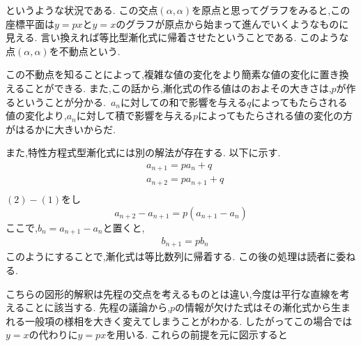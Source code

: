
  というような状況である.
  この交点$(\alpha,\alpha)$を原点と思ってグラフをみると,この座標平面は$y=px$と$y=x$のグラフが原点から始まって進んでいくようなものに見える.
  言い換えれば等比型漸化式に帰着させたということである.
  このような点$(\alpha,\alpha)$を不動点という.

  この不動点を知ることによって,複雑な値の変化をより簡素な値の変化に置き換えることができる.
  また,この話から,漸化式の作る値はのおよその大きさは,$p$が作るということが分かる.
  \,$a_n$に対しての和で影響を与える$q$によってもたらされる値の変化より,$a_n$に対して積で影響を与える$p$によってもたらされる値の変化の方がはるかに大きいからだ.

  また,特性方程式型漸化式には別の解法が存在する.
  以下に示す.
  \begin{align*}
    &a_{n+1}=pa_n+q \tag*{\(\cdots\) (1)}\\
    &a_{n+2}=pa_{n+1}+q \tag*{\(\cdots\) (2)}\\
  \end{align*}
  $(2)-(1)$をし
  \[
    a_{n+2}-a_{n+1}=p(a_{n+1}-a_n)
  \]
  ここで,$b_n=a_{n+1}-a_n$と置くと,
  \begin{align*}
    &b_{n+1}=pb_n
  \end{align*}
  このようにすることで,漸化式は等比数列に帰着する.
  この後の処理は読者に委ねる.

  こちらの図形的解釈は先程の交点を考えるものとは違い,今度は平行な直線を考えることに該当する.
  先程の議論から,$p$の情報が欠けた式はその漸化式から生まれる一般項の様相を大きく変えてしまうことがわかる.
  したがってこの場合では$y=x$の代わりに$y=px$を用いる.
  これらの前提を元に図示すると


